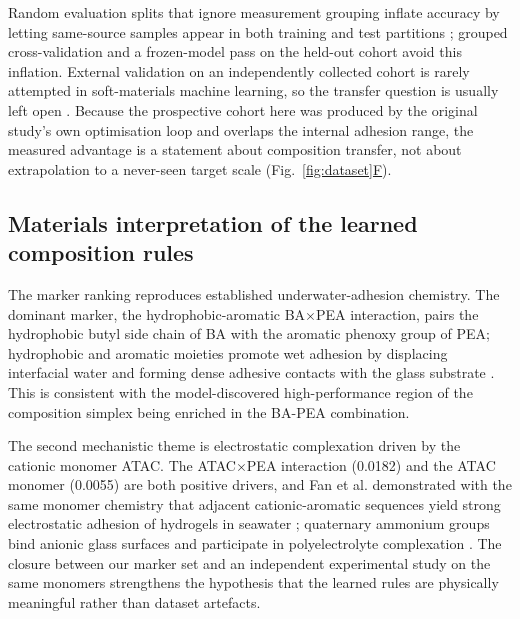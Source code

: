 \documentclass[utf8]{FrontiersinHarvard}
\newcommand{\Fref}[2]{Fig.~\hyperref[#1]{\ref{#1}#2}}
\begin{document}
Random evaluation splits that ignore measurement grouping inflate accuracy by letting same-source samples appear in both training and test partitions \cite{ovadia2019uncertainty,quinonero2009dataset}; grouped cross-validation and a frozen-model pass on the held-out cohort avoid this inflation. External validation on an independently collected cohort is rarely attempted in soft-materials machine learning, so the transfer question is usually left open \cite{mouret2017realitygap,shen2021ood,gulrajani2021domain}. Because the prospective cohort here was produced by the original study's own optimisation loop and overlaps the internal adhesion range, the measured advantage is a statement about composition transfer, not about extrapolation to a never-seen target scale (\Fref{fig:dataset}{F}).

\subsection{Materials interpretation of the learned composition rules}

The marker ranking reproduces established underwater-adhesion chemistry. The dominant marker, the hydrophobic-aromatic BA$\times$PEA interaction, pairs the hydrophobic butyl side chain of BA with the aromatic phenoxy group of PEA; hydrophobic and aromatic moieties promote wet adhesion by displacing interfacial water and forming dense adhesive contacts with the glass substrate \cite{cai2021bioadhesives,maier2015saltdisplacement,narayanan2021underwater,zhang2020catechol,lee2007mussel,waite2017mussel,recent2022tan,recent2021zhu,recent2024panb,recent2022yangb,recent2021ma}. This is consistent with the model-discovered high-performance region of the composition simplex being enriched in the BA-PEA combination.

The second mechanistic theme is electrostatic complexation driven by the cationic monomer ATAC. The ATAC$\times$PEA interaction (0.0182) and the ATAC monomer (0.0055) are both positive drivers, and Fan et al. demonstrated with the same monomer chemistry that adjacent cationic-aromatic sequences yield strong electrostatic adhesion of hydrogels in seawater \cite{fan2019cationicaromatic}; quaternary ammonium groups bind anionic glass surfaces and participate in polyelectrolyte complexation \cite{zhao2016polyelectrolyte,gong2010doublenetwork,wei2013musseldervied,wang2021selfcoacervation}. The closure between our marker set and an independent experimental study on the same monomers strengthens the hypothesis that the learned rules are physically meaningful rather than dataset artefacts.
\end{document}
